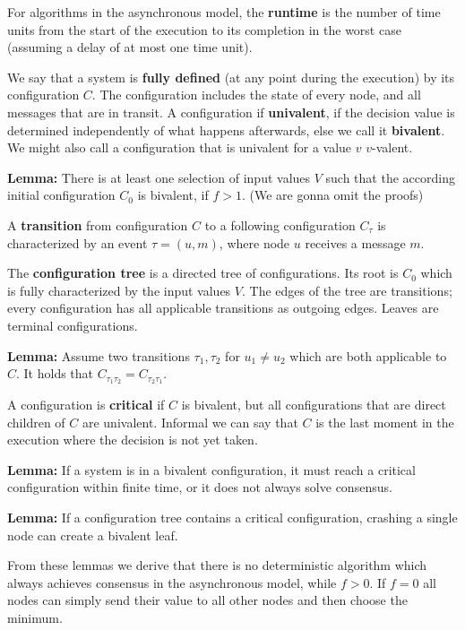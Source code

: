 For algorithms in the asynchronous model, the \textbf{runtime} is the number of time units from the start of the execution to its completion in the worst case (assuming a delay of at most one time unit). \medskip

We say that a system is \textbf{fully defined} (at any point during the execution) by its configuration $C$. The configuration includes the state of every node, and all messages that are in transit. A configuration if \textbf{univalent}, if the decision value is determined independently of what happens afterwards, else we call it \textbf{bivalent}. We might also call a configuration that is univalent for a value $v$ $v$-valent.\medskip

\textbf{Lemma:} There is at least one selection of input values $V$ such that the according initial configuration $C_0$ is bivalent, if $f > 1$. (We are gonna omit the proofs) \medskip

A \textbf{transition} from configuration $C$ to a following configuration $C_\tau$ is characterized by an event $\tau = (u, m)$, where node $u$ receives a message $m$. \medskip

The \textbf{configuration tree} is a directed tree of configurations. Its root is $C_0$ which is fully characterized by the input values $V$. The edges of the tree are transitions; every configuration has all applicable transitions as outgoing edges. Leaves are terminal configurations. \medskip

\textbf{Lemma:} Assume two transitions $\tau_1, \tau_2$ for $u_1 \neq u_2$ which are both applicable to $C$. It holds that $C_{\tau_1 \tau_2} = C_{\tau_2 \tau_1}$. \medskip

A configuration is \textbf{critical} if $C$ is bivalent, but all configurations that are direct children of $C$ are univalent. Informal we can say that $C$ is the last moment in the execution where the decision is not yet taken. \medskip

\textbf{Lemma:} If a system is in a bivalent configuration, it must reach a critical configuration within finite time, or it does not always solve consensus. \medskip

\textbf{Lemma:} If a configuration tree contains a critical configuration, crashing a single node can create a bivalent leaf.\medskip

From these lemmas we derive that there is no deterministic algorithm which always achieves consensus in the asynchronous model, while $f > 0$. If $f = 0$ all nodes can simply send their value to all other nodes and then choose the minimum.


